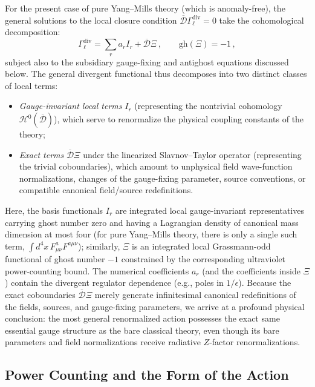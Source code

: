 For the present case of pure Yang--Mills theory (which is anomaly-free), the general solutions to the local closure condition \(\overline{\mathcal{D}}\Gamma_\ell^{\text{div}} = 0\) take the cohomological decomposition:
\begin{equation} \label{eq:cohomological_solution_gamma_div}
    \Gamma_\ell^{\text{div}} = \sum_r a_r I_r + \overline{\mathcal{D}}\Xi \, , \qquad \text{gh}(\Xi) = -1 \, ,
\end{equation}
subject also to the subsidiary gauge-fixing and antighost equations discussed below. The general divergent functional thus decomposes into two distinct classes of local terms:
\begin{itemize}
    \item \textit{Gauge-invariant local terms} \(I_r\) (representing the nontrivial cohomology \(\mathcal{H}^0(\overline{\mathcal{D}})\)), which serve to renormalize the physical coupling constants of the theory;
    \item \textit{Exact terms} \(\overline{\mathcal{D}}\Xi\) under the linearized Slavnov--Taylor operator (representing the trivial coboundaries), which amount to unphysical field wave-function normalizations, changes of the gauge-fixing parameter, source conventions, or compatible canonical field/source redefinitions.
\end{itemize}
Here, the basis functionals \(I_r\) are integrated local gauge-invariant representatives carrying ghost number zero and having a Lagrangian density of canonical mass dimension at most four (for pure Yang--Mills theory, there is only a single such term, \(\int d^4x \, F_{\mu\nu}^a F^{a\mu\nu}\)); similarly, \(\Xi\) is an integrated local Grassmann-odd functional of ghost number \(-1\) constrained by the corresponding ultraviolet power-counting bound. The numerical coefficients \(a_r\) (and the coefficients inside \(\Xi\)) contain the divergent regulator dependence (e.g., poles in \(1/\epsilon\)). Because the exact coboundaries \(\overline{\mathcal{D}}\Xi\) merely generate infinitesimal canonical redefinitions of the fields, sources, and gauge-fixing parameters, we arrive at a profound physical conclusion: the most general renormalized action possesses the exact same essential gauge structure as the bare classical theory, even though its bare parameters and field normalizations receive radiative \(Z\)-factor renormalizations.

\subsection{Power Counting and the Form of the Action}

